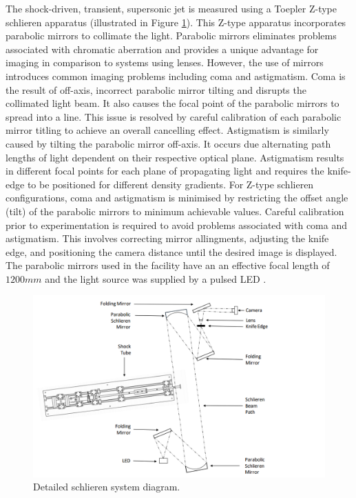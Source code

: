 The shock-driven, transient, supersonic jet is measured using a Toepler Z-type schlieren apparatus \citep{settles2001schlieren} (illustrated in Figure \ref{fig:schlieren}). This Z-type apparatus incorporates parabolic mirrors to collimate the light. Parabolic mirrors eliminates problems associated with chromatic aberration and provides a unique advantage for imaging in comparison to systems using lenses. However, the use of mirrors introduces common imaging problems including coma and astigmatism. Coma is the result of off-axis, incorrect parabolic mirror tilting and disrupts the collimated light beam. It also causes the focal point of the parabolic mirrors to spread into a line. This issue is resolved by careful calibration of each parabolic mirror titling to achieve an overall cancelling effect.  Astigmatism is similarly caused by tilting the parabolic mirror off-axis. It occurs due alternating path lengths of light dependent on their respective optical plane. Astigmatism results in different focal points for each plane of propagating light and requires the knife-edge to be positioned for different density gradients. For Z-type schlieren configurations, coma and astigmatism is minimised by restricting the offset angle (tilt) of the parabolic mirrors to minimum achievable values. Careful calibration prior to experimentation is required to avoid problems associated with coma and astigmatism. This involves correcting mirror allingments, adjusting the knife edge, and positioning the camera distance until the desired image is displayed. The parabolic mirrors used in the facility have an an effective focal length of $1200mm$ and the light source was supplied by a pulsed LED \citep{willert2012assessment}. 

\begin{figure}[H] 
	\centering
	\includegraphics[width=1\textwidth]{schlieren.png} 
	\caption{Detailed schlieren system diagram.}
	\label{fig:schlieren}
\end{figure}

